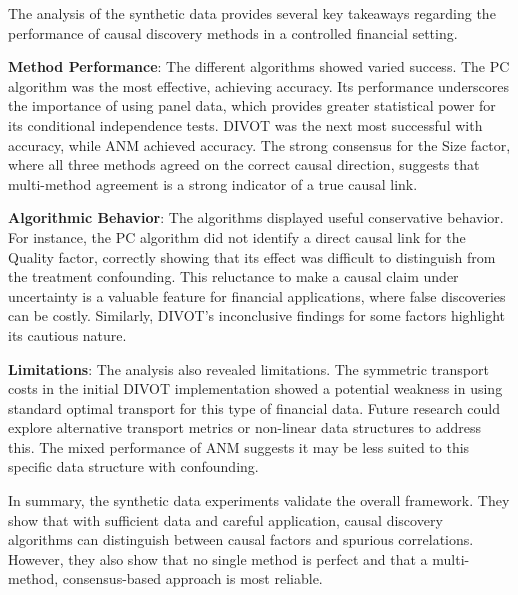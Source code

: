 The analysis of the synthetic data provides several key takeaways regarding the performance of causal discovery methods in a controlled financial setting.

\textbf{Method Performance}: The different algorithms showed varied success. The PC algorithm was the most effective, achieving \SyntheticPCAccuracy{} accuracy. Its performance underscores the importance of using panel data, which provides greater statistical power for its conditional independence tests. DIVOT was the next most successful with \SyntheticDivotAccuracy{} accuracy, while ANM achieved \SyntheticANMAccuracy{} accuracy. The strong consensus for the Size factor, where all three methods agreed on the correct causal direction, suggests that multi-method agreement is a strong indicator of a true causal link.

\textbf{Algorithmic Behavior}: The algorithms displayed useful conservative behavior. For instance, the PC algorithm did not identify a direct causal link for the Quality factor, correctly showing that its effect was difficult to distinguish from the treatment confounding. This reluctance to make a causal claim under uncertainty is a valuable feature for financial applications, where false discoveries can be costly. Similarly, DIVOT's inconclusive findings for some factors highlight its cautious nature.

\textbf{Limitations}: The analysis also revealed limitations. The symmetric transport costs in the initial DIVOT implementation showed a potential weakness in using standard optimal transport for this type of financial data. Future research could explore alternative transport metrics or non-linear data structures to address this. The mixed performance of ANM suggests it may be less suited to this specific data structure with confounding.

In summary, the synthetic data experiments validate the overall framework. They show that with sufficient data and careful application, causal discovery algorithms can distinguish between causal factors and spurious correlations. However, they also show that no single method is perfect and that a multi-method, consensus-based approach is most reliable.